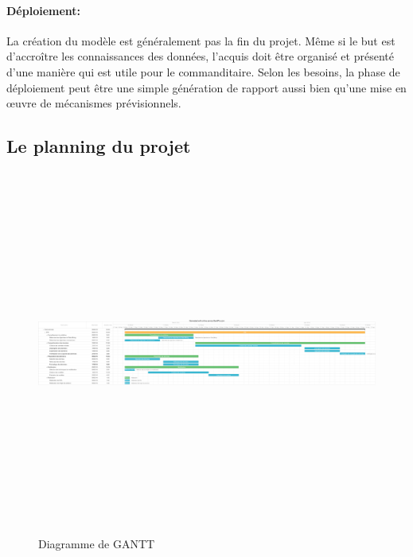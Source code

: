 	\paragraph{Déploiement:}
	La création du modèle est généralement pas la fin du projet. Même si le but est d'accroître les connaissances des données, l'acquis doit être organisé et présenté d'une manière qui est utile pour le commanditaire. Selon les besoins, la phase de déploiement peut être une simple génération de rapport aussi bien qu'une mise en œuvre de mécanismes prévisionnels.
	

	\begin{landscape}
	\subsection{Le planning du projet}
		\begin{figure}[H]
    			\centering
    			\includegraphics[width=26cm,height=12cm]{gantt.pdf}
    			\caption{Diagramme de GANTT}
    			\label{fig:gantt}
		\end{figure}
	\end{landscape}
	
